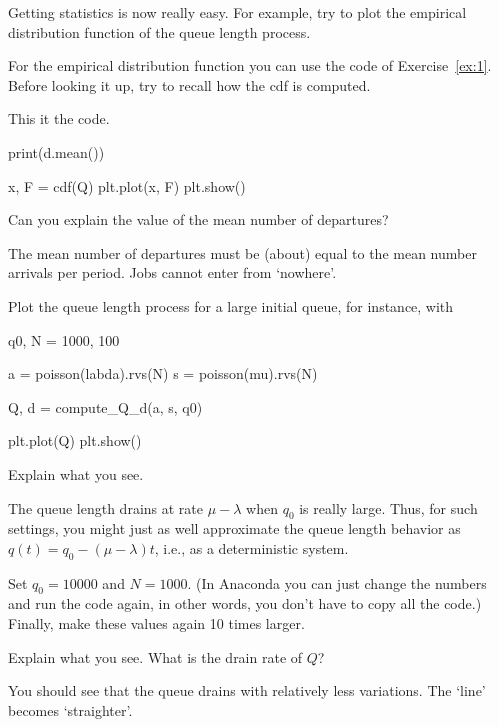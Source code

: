 \begin{exercise}
  Getting statistics is now really easy. For example,  try to plot the empirical distribution function of the queue length process.
  \begin{hint}
For  the empirical distribution function  you can use the code of Exercise~\ref{ex:1}. Before looking it up, try to recall how the cdf is computed.
  \end{hint}


  \begin{solution}
This it the code.    
  \begin{pyverbatim}
print(d.mean())
    
x, F = cdf(Q)
plt.plot(x, F)
plt.show()
  \end{pyverbatim}
  \end{solution}
\end{exercise}

\begin{exercise}
  Can you explain the value of the mean number of departures?
  \begin{solution}
    The mean number of departures must  be (about) equal  to the mean number arrivals per period. Jobs cannot enter from `nowhere'.
  \end{solution}
\end{exercise}


\begin{exercise}
Plot the queue length process for a large initial queue, for instance, with

\begin{pyverbatim}
q0, N = 1000, 100

a = poisson(labda).rvs(N)
s = poisson(mu).rvs(N)

Q, d = compute_Q_d(a, s, q0)

plt.plot(Q)
plt.show()
\end{pyverbatim}
Explain what you see.
\begin{solution}
  The queue length drains at rate $\mu-\lambda$ when $q_0$ is really large. Thus, for such settings, you might just as well approximate the queue length behavior as $q(t) = q_0 - (\mu-\lambda)t$, i.e., as a deterministic system.
\end{solution}
\end{exercise}


\begin{exercise}
Set $q_0=10000$ and $N=1000$.  (In Anaconda you can just change the numbers and run the code again, in other words, you don't have to copy all the code.) Finally,  make these values again 10 times larger. 

Explain what you see. What is the drain rate of $Q$?
\begin{solution}
  You should see that the queue drains with relatively less variations. The `line' becomes `straighter'. 
\end{solution}
\end{exercise}

